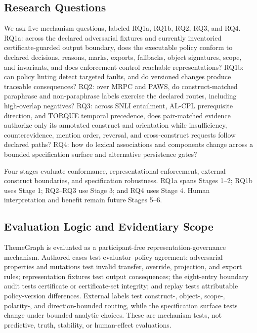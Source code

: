 \documentclass[manuscript,screen,review,anonymous]{acmart}
\begin{document}
\subsection{Research Questions}

We ask five mechanism questions, labeled RQ1a, RQ1b, RQ2, RQ3, and RQ4. RQ1a: across the declared adversarial fixtures and currently inventoried certificate-guarded output boundary, does the executable policy conform to declared decisions, reasons, marks, exports, fallbacks, object signatures, scope, and invariants, and does enforcement control reachable representations? RQ1b: can policy linting detect targeted faults, and do versioned changes produce traceable consequences? RQ2: over MRPC and PAWS, do construct-matched paraphrase and non-paraphrase labels exercise the declared routes, including high-overlap negatives? RQ3: across SNLI entailment, AL-CPL prerequisite direction, and TORQUE temporal precedence, does pair-matched evidence authorize only its annotated construct and orientation while insufficiency, counterevidence, mention order, reversal, and cross-construct requests follow declared paths? RQ4: how do lexical associations and components change across a bounded specification surface and alternative persistence gates?

Four stages evaluate conformance, representational enforcement, external construct boundaries, and specification robustness. RQ1a spans Stages 1--2; RQ1b uses Stage 1; RQ2--RQ3 use Stage 3; and RQ4 uses Stage 4. Human interpretation and benefit remain future Stages 5--6.

\subsection{Evaluation Logic and Evidentiary Scope}

ThemeGraph is evaluated as a participant-free representation-governance mechanism. Authored cases test evaluator--policy agreement; adversarial properties and mutations test invalid transfer, override, projection, and export rules; representation fixtures test output consequences; the eight-entry boundary audit tests certificate or certificate-set integrity; and replay tests attributable policy-version differences. External labels test construct-, object-, scope-, polarity-, and direction-bounded routing, while the specification surface tests change under bounded analytic choices. These are mechanism tests, not predictive, truth, stability, or human-effect evaluations.
\end{document}
